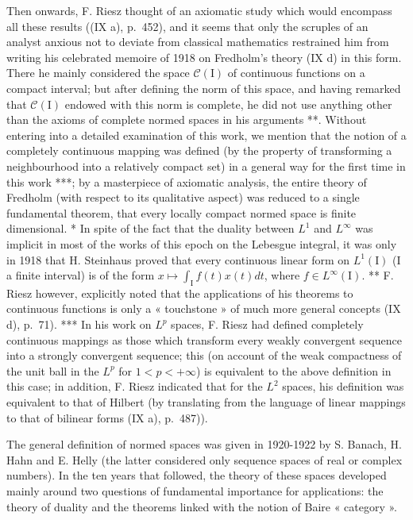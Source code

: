 Then onwards, F. Riesz thought of an axiomatic study which would encompass all these results ((IX a), p.~452), and it seems that only the scruples of an analyst anxious not to deviate from classical mathematics restrained him from writing his celebrated memoire of 1918 on Fredholm's theory (IX d) in this form. There he mainly considered the space \(\mathcal{C}(\mathrm{I})\) of continuous functions on a compact interval; but after defining the norm of this space, and having remarked that \(\mathcal{C}(\mathrm{I})\) endowed with this norm is complete, he did not use anything other than the axioms of complete normed spaces in his arguments **. Without entering into a detailed examination of this work, we mention that the notion of a completely continuous mapping was defined (by the property of transforming a neighbourhood into a relatively compact set) in a general way for the first time in this work ***; by a masterpiece of axiomatic analysis, the entire theory of Fredholm (with respect to its qualitative aspect) was reduced to a single fundamental theorem, that every locally compact normed space is finite dimensional.
* In spite of the fact that the duality between \(L^1\) and \(L^\infty\) was implicit in most of the works of this epoch on the Lebesgue integral, it was only in 1918 that H. Steinhaus proved that every continuous linear form on \(L^1(\mathrm{I})\) (I a finite interval) is of the form \(x\mapsto\int_{\mathrm{I}} f(t)x(t)dt\), where \(f\in L^\infty(\mathrm{I})\).
** F. Riesz however, explicitly noted that the applications of his theorems to continuous functions is only a « touchstone » of much more general concepts (IX d), p.~71).
*** In his work on \(L^p\) spaces, F. Riesz had defined completely continuous mappings as those which transform every weakly convergent sequence into a strongly convergent sequence; this (on account of the weak compactness of the unit ball in the \(L^p\) for \(1 < p < +\infty\)) is equivalent to the above definition in this case; in addition, F. Riesz indicated that for the \(L^2\) spaces, his definition was equivalent to that of Hilbert (by translating from the language of linear mappings to that of bilinear forms (IX a), p.~487)).

The general definition of normed spaces was given in 1920-1922 by S. Banach, H. Hahn and E. Helly (the latter considered only sequence spaces of real or complex numbers). In the ten years that followed, the theory of these spaces developed mainly around two questions of fundamental importance for applications: the theory of duality and the theorems linked with the notion of Baire « category ».


